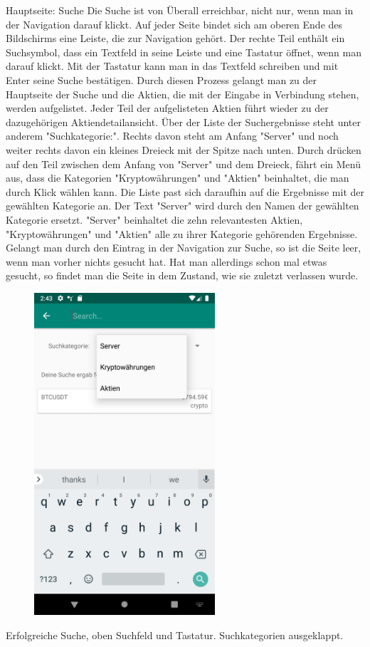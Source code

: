 \documentclass[10pt]{scrartcl}
\begin{document}
Hauptseite: Suche
Die Suche ist von Überall erreichbar, nicht nur, wenn man in der Navigation darauf klickt. Auf jeder Seite bindet sich am oberen Ende des Bildschirms eine Leiste, die zur Navigation gehört. Der rechte Teil enthält ein Suchsymbol, dass ein Textfeld in seine Leiste und eine Tastatur öffnet, wenn man darauf klickt. Mit der Tastatur kann man in das Textfeld schreiben und mit Enter seine Suche bestätigen. Durch diesen Prozess gelangt man zu der Hauptseite der Suche und die Aktien, die mit der Eingabe in Verbindung stehen, werden aufgelistet. Jeder Teil der aufgelisteten Aktien führt wieder zu der dazugehörigen Aktiendetailansicht. Über der Liste der Suchergebnisse steht unter anderem "Suchkategorie:". Rechts davon steht am Anfang "Server" und noch weiter rechts davon ein kleines Dreieck mit der Spitze nach unten. Durch drücken auf den Teil zwischen dem Anfang von "Server" und dem Dreieck, fährt ein Menü aus, dass die Kategorien "Kryptowährungen" und "Aktien" beinhaltet, die man durch Klick wählen kann. Die Liste past sich daraufhin auf die Ergebnisse mit der gewählten Kategorie an. Der Text "Server" wird durch den Namen der gewählten Kategorie ersetzt. 
"Server" beinhaltet die zehn relevantesten Aktien, "Kryptowährungen" und "Aktien" alle zu ihrer Kategorie gehörenden Ergebnisse.
Gelangt man durch den Eintrag in der Navigation zur Suche, so ist die Seite leer, wenn man vorher nichts gesucht hat. Hat man allerdings schon mal etwas gesucht, so findet man die Seite in dem Zustand, wie sie zuletzt verlassen wurde.

\begin{figure}[H]
	\centering
	\includegraphics[width=0.6\textwidth]{Bilder/Applikation/Suche.png}
\end{figure}
Erfolgreiche Suche, oben Suchfeld und Tastatur. Suchkategorien ausgeklappt.
\end{document}
